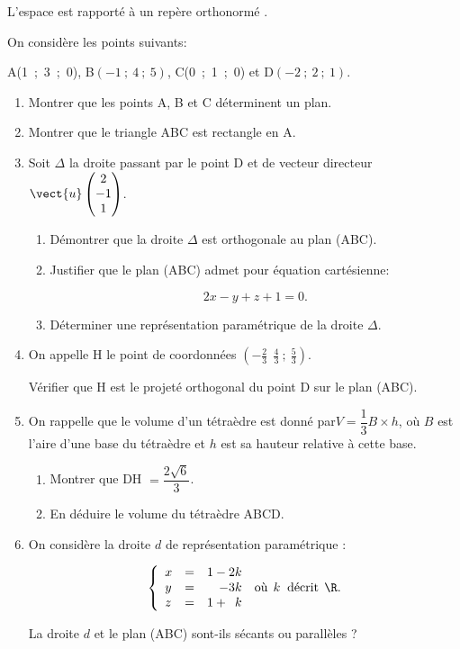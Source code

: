 \medskip

L'espace est rapporté à un repère orthonormé \Oijk.

On considère les points suivants:

\begin{center}A(1~;~3~;~0), \quad B$(-1~;~4~;~5)$, \quad C(0~;~1~;~0) \quad et \quad D$(- 2~;~2~;~1)$.\end{center}

\begin{enumerate}
\item Montrer que les points A, B et C déterminent un plan.
\item Montrer que le triangle ABC est rectangle en A.
\item Soit $\Delta$ la droite passant par le point D et de vecteur directeur $\vect{u}\begin{pmatrix}2\\-1\\1\end{pmatrix}$.
	\begin{enumerate}
		\item Démontrer que la droite $\Delta$ est orthogonale au plan (ABC).
		\item Justifier que le plan (ABC) admet pour équation cartésienne:

\[2x - y + z + 1 = 0.\]

		\item Déterminer une représentation paramétrique de la droite $\Delta$.
	\end{enumerate}
\item On appelle H le point de coordonnées $\left(-\frac 23~ ~\frac 43~;~\frac 53\right)$.

Vérifier que H est le projeté orthogonal du point D sur le plan (ABC).
\item On rappelle que le volume d'un tétraèdre est donné par$ V = \dfrac 13 B \times h$, où $B$ est l'aire
 d'une base du tétraèdre et $h$ est sa hauteur relative à cette base.
	\begin{enumerate}
		\item Montrer que DH $=\dfrac{2\sqrt 6}{3}$.
		\item En déduire le volume du tétraèdre ABCD.
	\end{enumerate}
\item On considère la droite $d$ de représentation paramétrique :

\[\left\{\begin{array}{l c r}
x&=&1 - 2k\\
y&=& - 3k\\
z&=&1 + \phantom{3}k\end{array}\right. \: \text{où}\:\: k \:\ \text{décrit}\:\: \R.\]

La droite $d$ et le plan (ABC) sont-ils sécants ou parallèles ?
\end{enumerate}

\bigskip
